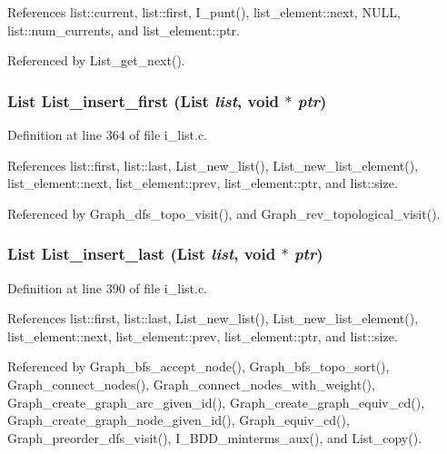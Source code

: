 References list::current, list::first, I\_\-punt(), list\_\-element::next, NULL, list::num\_\-currents, and list\_\-element::ptr.

Referenced by List\_\-get\_\-next().
\subsubsection{\setlength{\rightskip}{0pt plus 5cm}\bf{List} List\_\-insert\_\-first (\bf{List} {\em list}, void $\ast$ {\em ptr})}\label{i__list_8h_d760aaef744064bc602600d2c1136dfd}




Definition at line 364 of file i\_\-list.c.

References list::first, list::last, List\_\-new\_\-list(), List\_\-new\_\-list\_\-element(), list\_\-element::next, list\_\-element::prev, list\_\-element::ptr, and list::size.

Referenced by Graph\_\-dfs\_\-topo\_\-visit(), and Graph\_\-rev\_\-topological\_\-visit().
\subsubsection{\setlength{\rightskip}{0pt plus 5cm}\bf{List} List\_\-insert\_\-last (\bf{List} {\em list}, void $\ast$ {\em ptr})}\label{i__list_8h_c38e6bec0b49dcd3a6a831d57a5997ee}




Definition at line 390 of file i\_\-list.c.

References list::first, list::last, List\_\-new\_\-list(), List\_\-new\_\-list\_\-element(), list\_\-element::next, list\_\-element::prev, list\_\-element::ptr, and list::size.

Referenced by Graph\_\-bfs\_\-accept\_\-node(), Graph\_\-bfs\_\-topo\_\-sort(), Graph\_\-connect\_\-nodes(), Graph\_\-connect\_\-nodes\_\-with\_\-weight(), Graph\_\-create\_\-graph\_\-arc\_\-given\_\-id(), Graph\_\-create\_\-graph\_\-equiv\_\-cd(), Graph\_\-create\_\-graph\_\-node\_\-given\_\-id(), Graph\_\-equiv\_\-cd(), Graph\_\-preorder\_\-dfs\_\-visit(), I\_\-BDD\_\-minterms\_\-aux(), and List\_\-copy().
